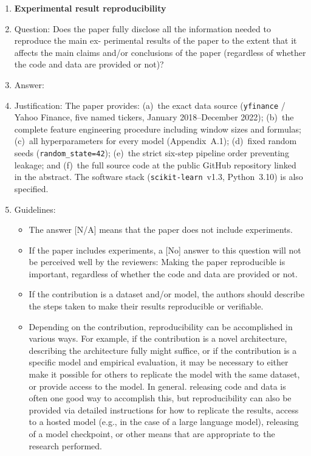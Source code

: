 \documentclass{article}
\begin{document}
\begin{enumerate}
\item {\bf Experimental result reproducibility}
    \item[] Question: Does the paper fully disclose all the information needed to reproduce the main ex-
perimental results of the paper to the extent that it affects the main claims and/or conclusions
of the paper (regardless of whether the code and data are provided or not)?
    \item[] Answer: \answerYes{}
    \item[] Justification: The paper provides: (a)~the exact data source (\texttt{yfinance} /
    Yahoo Finance, five named tickers, January 2018--December 2022); (b)~the complete
    feature engineering procedure including window sizes and formulas; (c)~all hyperparameters
    for every model (Appendix~A.1); (d)~fixed random seeds (\texttt{random\_state=42});
    (e)~the strict six-step pipeline order preventing leakage; and (f)~the full source code at
    the public GitHub repository linked in the abstract. The software stack
    (\texttt{scikit-learn}~v1.3, Python~3.10) is also specified.
    \item[] Guidelines:
    \begin{itemize}
        \item The answer [N/A] means that the paper does not include experiments.
        \item If the paper includes experiments, a [No] answer to this question will not be perceived
well by the reviewers: Making the paper reproducible is important, regardless of
whether the code and data are provided or not.
        \item If the contribution is a dataset and/or model, the authors should describe the steps taken
to make their results reproducible or verifiable.
        \item Depending on the contribution, reproducibility can be accomplished in various ways.
For example, if the contribution is a novel architecture, describing the architecture fully
might suffice, or if the contribution is a specific model and empirical evaluation, it may
be necessary to either make it possible for others to replicate the model with the same
dataset, or provide access to the model. In general. releasing code and data is often
one good way to accomplish this, but reproducibility can also be provided via detailed
instructions for how to replicate the results, access to a hosted model (e.g., in the case
of a large language model), releasing of a model checkpoint, or other means that are
appropriate to the research performed.

\end{itemize}
\end{enumerate}
\end{document}
